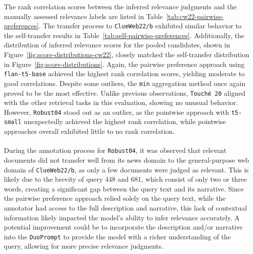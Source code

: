 The rank correlation scores between the inferred relevance judgments and the manually assessed relevance labels are listed in Table~\ref{tab:cw22-pairwise-preferences}. The transfer process to \texttt{ClueWeb22/b} exhibited similar behavior to the self-transfer results in \mbox{Table~\ref{tab:self-pairwise-preferences}}. Additionally, the distribution of inferred relevance scores for the pooled candidates, shown in Figure~\ref{fig:score-distributions-cw22}, closely matched the self-transfer distribution in Figure~\ref{fig:score-distributions}. Again, the pairwise preference approach using \texttt{flan-t5-base} achieved the highest rank correlation scores, yielding moderate to good correlations. Despite some outliers, the \texttt{min} aggregation method once again proved to be the most effective. Unlike previous observations, \mbox{\texttt{Touché 20}} aligned with the other retrieval tasks in this evaluation, showing no unusual behavior. However, \texttt{Robust04} stood out as an outlier, as the pointwise approach with \texttt{t5-small} unexpectedly achieved the highest rank correlation, while pointwise approaches overall exhibited little to no rank correlation.
\\\\
During the annotation process for \texttt{Robust04}, it was observed that relevant documents did not transfer well from its news domain to the general-purpose web domain of \texttt{ClueWeb22/b}, as only a few documents were judged as relevant. This is likely due to the brevity of query 448 and 681, which consist of only two or three words, creating a significant gap between the query text and its narrative. Since the pairwise preference approach relied solely on the query text, while the annotator had access to the full description and narrative, this lack of contextual information likely impacted the model's ability to infer relevance accurately. A potential improvement could be to incorporate the description and/or narrative into the \texttt{DuoPrompt} to provide the model with a richer understanding of the query, allowing for more precise relevance \mbox{judgments}.
